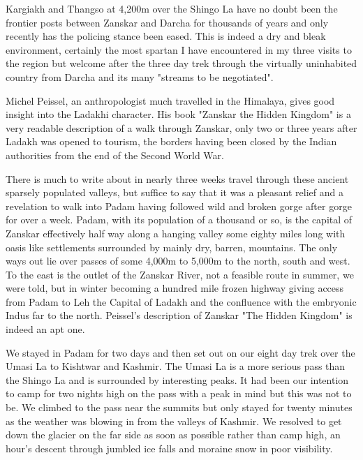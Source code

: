 \documentclass[a5paper,openany,font 10pt]{scrbook}
\begin{document}
Kargiakh and Thangso at 4,200m over the Shingo La have no
doubt been the frontier posts between  Zanskar and Darcha for
thousands of years and only recently has the policing stance been
eased. This is indeed a dry and bleak environment, certainly the
most spartan I have encountered in my three visits to the region
but welcome after the three day trek through the virtually
uninhabited country from Darcha and its many "streams to be
negotiated".

Michel Peissel, an anthropologist much travelled in the
Himalaya, gives good insight into the Ladakhi character. His book
"Zanskar   the Hidden Kingdom" is a very readable description of
a walk through Zanskar, only two or three years after Ladakh was
opened to tourism, the borders having been closed by the Indian
authorities from the end of the Second World War.

There is much to write about in nearly three weeks travel
through these ancient sparsely populated valleys, but suffice to
say that it was a pleasant relief and a revelation to walk into
Padam having followed wild and broken gorge after gorge for over
a week. Padam, with its population of a thousand or so, is the
capital of Zanskar   effectively half way along a hanging valley
some eighty miles long with oasis like settlements surrounded by
mainly dry, barren, mountains. The only ways out lie over passes
of some 4,000m to 5,000m to the north, south and west. To the
east is the outlet of the Zanskar River, not a feasible route in
summer, we were told, but in winter becoming a hundred mile
frozen highway giving access from Padam to Leh  the Capital of
Ladakh  and the confluence with the embryonic Indus far to the
north. Peissel's description of Zanskar   "The Hidden Kingdom"
is indeed an apt one.

We stayed in Padam for two days and then set out on our
eight day trek over the Umasi La to Kishtwar and Kashmir. The
Umasi La is a more serious pass than the Shingo La and is
surrounded by interesting peaks. It had been our intention to
camp for two nights high on the pass with a peak in mind but this
was not to be. We climbed to the pass near the summits but only
stayed for twenty minutes as the weather was blowing in from the
valleys of Kashmir. We resolved to get down the glacier on the
far side as soon as possible rather than camp high, an hour's
descent through jumbled ice falls and moraine snow in poor
visibility.
\end{document}
